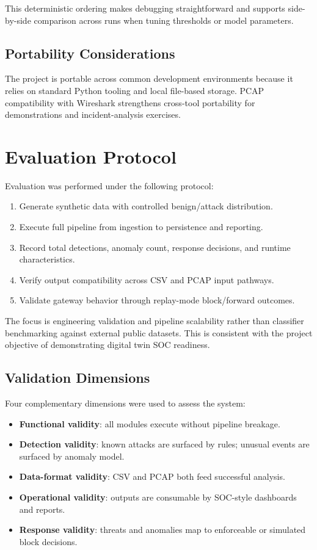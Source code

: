 \documentclass[conference]{IEEEtran}
\begin{document}
This deterministic ordering makes debugging straightforward and supports side-by-side comparison across runs when tuning thresholds or model parameters.

\subsection{Portability Considerations}
The project is portable across common development environments because it relies on standard Python tooling and local file-based storage. PCAP compatibility with Wireshark strengthens cross-tool portability for demonstrations and incident-analysis exercises.

\section{Evaluation Protocol}
Evaluation was performed under the following protocol:
\begin{enumerate}
    \item Generate synthetic data with controlled benign/attack distribution.
    \item Execute full pipeline from ingestion to persistence and reporting.
    \item Record total detections, anomaly count, response decisions, and runtime characteristics.
    \item Verify output compatibility across CSV and PCAP input pathways.
    \item Validate gateway behavior through replay-mode block/forward outcomes.
\end{enumerate}

The focus is engineering validation and pipeline scalability rather than classifier benchmarking against external public datasets. This is consistent with the project objective of demonstrating digital twin SOC readiness.

\subsection{Validation Dimensions}
Four complementary dimensions were used to assess the system:
\begin{itemize}
    \item \textbf{Functional validity}: all modules execute without pipeline breakage.
    \item \textbf{Detection validity}: known attacks are surfaced by rules; unusual events are surfaced by anomaly model.
    \item \textbf{Data-format validity}: CSV and PCAP both feed successful analysis.
    \item \textbf{Operational validity}: outputs are consumable by SOC-style dashboards and reports.
    \item \textbf{Response validity}: threats and anomalies map to enforceable or simulated block decisions.
\end{itemize}
\end{document}
